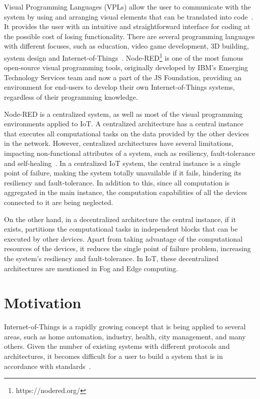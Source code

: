 Visual Programming Languages (VPLs) allow the user to communicate with the system by using and arranging visual elements that can be translated into code~\cite{vpl-book}. It provides the user with an intuitive and straightforward interface for coding at the possible cost of losing functionality. There are several programming languages with different focuses, such as education, video game development, 3D building, system design and Internet-of-Things~\cite{survey_vpl_iot}. Node-RED\footnote{https://nodered.org/} is one of the most famous open-source visual programming tools, originally developed by IBM’s Emerging Technology Services team and now a part of the JS Foundation, providing an environment for end-users to develop their own Internet-of-Things systems, regardless of their programming knowledge.

Node-RED is a centralized system, as well as most of the visual programming environments applied to IoT. A centralized architecture has a central instance that executes all computational tasks on the data provided by the other devices in the network. However, centralized architectures have several limitations, impacting non-functional attributes of a system, such as resiliency, fault-tolerance and self-healing~\cite{SEDES2018,selfheal20}. In a centralized IoT system, the central instance is a single point of failure, making the system totally unavailable if it fails, hindering its resiliency and fault-tolerance. In addition to this, since all computation is aggregated in the main instance, the computation capabilities of all the devices connected to it are being neglected.

On the other hand, in a decentralized architecture the central instance, if it exists, partitions the computational tasks in independent blocks that can be executed by other devices. Apart from taking advantage of the computational resources of the devices, it reduces the single point of failure problem, increasing the system's resiliency and fault-tolerance. In IoT, these decentralized architectures are mentioned in Fog and Edge computing. 

\section{Motivation} \label{sec:motivation}

Internet-of-Things is a rapidly growing concept that is being applied to several areas, such as home automation, industry, health, city management, and many others. Given the number of existing systems with different protocols and architectures, it becomes difficult for a user to build a system that is in accordance with standards~\cite{standard-iot}. 

